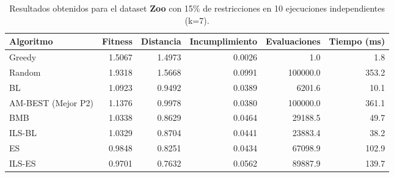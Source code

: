 \begin{table}[H]
    \centering
    \begin{tabular}{lrrrrr}
        \hline
        Algoritmo & Fitness & Distancia & Incumplimiento & Evaluaciones & Tiempo (ms)\\
        \hline
        Greedy & 1.5067 & 1.4973 & 0.0026 & 1.0 & 1.8 \\
        Random & 1.9318 & 1.5668 & 0.0991 & 100000.0 & 353.2 \\
        BL & 1.0923 & 0.9492 & 0.0389 & 6201.6 & 10.1 \\
        AM-BEST (Mejor P2) & 1.1376 & 0.9978 & 0.0380 & 100000.0 & 361.1 \\
        BMB & 1.0338 & 0.8629 & 0.0464 & 29188.5 & 49.7 \\
        ILS-BL & 1.0329 & 0.8704 & 0.0441 & 23883.4 & 38.2 \\
        ES & 0.9848 & 0.8251 & 0.0434 & 67098.9 & 102.9 \\
        ILS-ES & 0.9701 & 0.7632 & 0.0562 & 89887.9 & 139.7 \\
        \hline
    \end{tabular}
    \caption{Resultados obtenidos para el dataset \textbf{Zoo} con 15\% de restricciones en  10 ejecuciones independientes (k=7).}
    \label{tab:res_zoo_15}
\end{table}